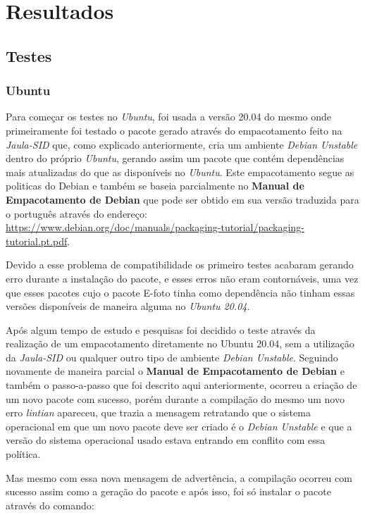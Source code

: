 \chapter{Resultados}

\section{Testes}

\subsection{Ubuntu}
Para começar os testes no \textit{Ubuntu}, foi usada a versão 20.04 do mesmo onde primeiramente foi testado o pacote gerado através do empacotamento feito na \textit{Jaula-SID} que, como explicado anteriormente, cria um ambiente \textit{Debian Unstable} dentro do próprio \textit{Ubuntu}, gerando assim um pacote que contém dependências mais atualizadas do que as disponíveis no \textit{Ubuntu}. Este empacotamento segue as politicas do Debian e também se baseia parcialmente no \textbf{Manual de Empacotamento de Debian} que pode ser obtido em sua versão traduzida para o português através do endereço: \url{https://www.debian.org/doc/manuals/packaging-tutorial/packaging-tutorial.pt.pdf}.
 
Devido a esse problema de compatibilidade os primeiro testes acabaram gerando erro durante a instalação do pacote, e esses erros não eram contornáveis, uma vez que esses pacotes cujo o pacote E-foto tinha como dependência não tinham essas versões disponíveis de maneira alguma no \textit{Ubuntu 20.04}. 

Após algum tempo de estudo e pesquisas foi decidido o teste através da realização de um empacotamento diretamente no Ubuntu 20.04, sem a utilização da \textit{Jaula-SID} ou qualquer outro tipo de ambiente \textit{Debian Unstable}. Seguindo novamente de maneira parcial o \textbf{Manual de Empacotamento de Debian} e também o passo-a-passo que foi descrito aqui anteriormente, ocorreu a criação de um novo pacote com sucesso, porém durante a compilação do mesmo um novo erro \textit{lintian} apareceu, que trazia a mensagem retratando que o sistema operacional em que um novo pacote deve ser criado é o \textit{Debian Unstable} e que a versão do sistema operacional usado estava entrando em conflito com essa política.

Mas mesmo com essa nova mensagem de advertência, a compilação ocorreu com sucesso assim como a geração do pacote e após isso, foi só instalar o pacote através do comando:

